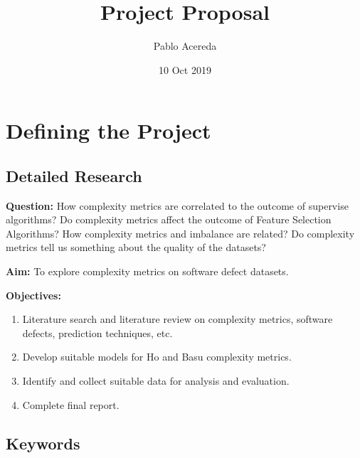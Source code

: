 \documentclass{article}
\title{Project Proposal}
\author{Pablo Acereda}
\date{10 Oct 2019}
\begin{document}
\maketitle


\section{Defining the Project}

\subsection{Detailed Research}

\textbf{Question:} How complexity metrics are correlated to the outcome of
supervise algorithms? Do complexity metrics affect the outcome of Feature
Selection Algorithms? How complexity metrics and imbalance are related? Do
complexity metrics tell us something about the quality of the datasets? 

\textbf{Aim:} To explore complexity metrics on software defect datasets.

\textbf{Objectives:} 

\begin{enumerate}

\item Literature search and literature review on complexity metrics, software
defects, prediction techniques, etc.

\item Develop suitable models for Ho and Basu complexity metrics.

\item Identify and collect suitable data for analysis and evaluation.

\item Complete final report.

\end{enumerate}


\subsection{Keywords}
\end{document}

